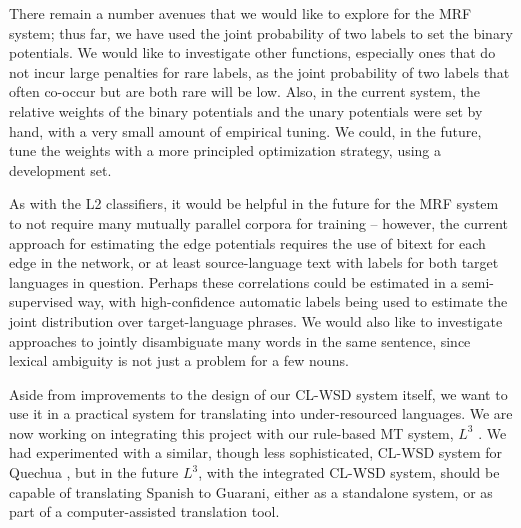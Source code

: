 \documentclass[11pt,letterpaper]{article}
\begin{document}
There remain a number avenues that we would like to explore for the MRF system;
thus far, we have used the joint probability of two labels to set the binary
potentials. We would like to investigate other functions, especially ones that
do not incur large penalties for rare labels, as the joint probability of two
labels that often co-occur but are both rare will be low.  Also, in the current
system, the relative weights of the binary potentials and the unary potentials
were set by hand, with a very small amount of empirical tuning. We could, in
the future, tune the weights with a more principled optimization strategy,
using a development set.


As with the L2 classifiers, it would be helpful in the future for the
MRF system to not require many mutually parallel corpora for training --
however, the current approach for estimating the edge potentials requires the
use of bitext for each edge in the network, or at least source-language text
with labels for both target languages in question. Perhaps these correlations
could be estimated in a semi-supervised way, with high-confidence automatic
labels being used to estimate the joint distribution over target-language
phrases.  We would also like to investigate approaches to jointly disambiguate
many words in the same sentence, since lexical ambiguity is not just a problem
for a few nouns.

Aside from improvements to the design of our CL-WSD system itself, we want to
use it in a practical system for translating into under-resourced languages.
We are now working on integrating this project with our rule-based MT system,
$L^3$ \cite{gasser:aflat2012}. We had experimented with a similar, though less
sophisticated, CL-WSD system for Quechua \cite{rudnick:2011:RANLPStud}, but in
the future $L^3$, with the integrated CL-WSD system, should be capable of
translating Spanish to Guarani, either as a standalone system, or as part of a
computer-assisted translation tool.



{}
\end{document}
